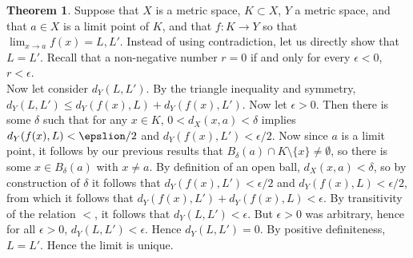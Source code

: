 \documentclass[11pt]{article}
\theoremstyle{definition}
\newtheorem{theorem}{Theorem}
\begin{document}
\begin{theorem}

Suppose that $X$ is a metric space, $K\subset X$, $Y$ a metric space, and that $a\in X$ is a limit point of $K$, and that $f:K\to Y$ so that $\lim_{x\to a} f(x) = L,L'$. Instead of using contradiction, let us directly show that $L  = L'$. Recall that a non-negative number $r = 0$ if and only for every $\epsilon < 0$, $r< \epsilon$. \\

Now let consider $d_Y(L , L')$. By the triangle inequality and symmetry, $d_Y(L , L') \le d_Y(f(x), L) + d_Y(f(x) , L')$. Now let $\epsilon > 0$. Then there is some $\delta$ such that for any $x\in K$, $0 < d_X(x,a) < \delta$ implies $d_Y(f(x), L) < \epslion /2$ and  $d_Y(f(x), L') < \epsilon/2$. Now since $a$ is a limit point, it follows by our previous results that $B_\delta(a) \cap K\setminus \{x\} \ne \emptyset$, so there is some $x\in B_\delta(a)$ with $x\ne a$. By definition of an open ball, $d_X(x,a) < \delta$, so by construction of $\delta$ it follows that $d_Y(f(x), L') < \epsilon/2$ and $d_Y(f(x), L) < \epsilon/2$, from which it follows that $d_Y(f(x), L') + d_Y(f(x), L) < \epsilon$. By transitivity of the relation $<$, it follows that $d_Y(L , L') < \epsilon$. But $\epsilon > 0$ was arbitrary, hence for all $\epsilon > 0$, $d_Y(L , L') < \epsilon$. Hence $d_Y(L, L') = 0$. By positive definiteness, $L = L'$. Hence the limit is unique.

\end{theorem}
\end{document}
